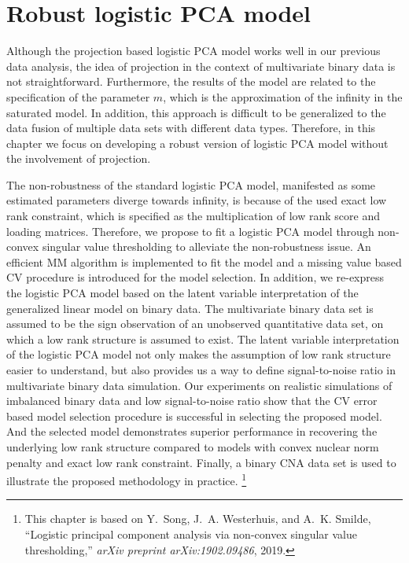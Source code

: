 \chapter{Robust logistic PCA model} \label{chapter:3}
Although the projection based logistic PCA model works well in our previous data analysis, the idea of projection in the context of multivariate binary data is not straightforward. Furthermore, the results of the model are related to the specification of the parameter $m$, which is the approximation of the infinity in the saturated model. In addition, this approach is difficult to be generalized to the data fusion of multiple data sets with different data types. Therefore, in this chapter we focus on developing a robust version of logistic PCA model without the involvement of projection.

The non-robustness of the standard logistic PCA model, manifested as some estimated parameters diverge towards infinity, is because of the used exact low rank constraint, which is specified as the multiplication of low rank score and loading matrices. Therefore, we propose to fit a logistic PCA model through non-convex singular value thresholding to alleviate the non-robustness issue. An efficient MM algorithm is implemented to fit the model and a missing value based CV procedure is introduced for the model selection. In addition, we re-express the logistic PCA model based on the latent variable interpretation of the generalized linear model on binary data. The multivariate binary data set is assumed to be the sign observation of an unobserved quantitative data set, on which a low rank structure is assumed to exist. The latent variable interpretation of the logistic PCA model not only makes the assumption of low rank structure easier to understand, but also provides us a way to define signal-to-noise ratio in multivariate binary data simulation. Our experiments on realistic simulations of imbalanced binary data and low signal-to-noise ratio show that the CV error based model selection procedure is successful in selecting the proposed model. And the selected model demonstrates superior performance in recovering the underlying low rank structure compared to models with convex nuclear norm penalty and exact low rank constraint. Finally, a binary CNA data set is used to illustrate the proposed methodology in practice.
\footnote{This chapter is based on Y.~Song, J.~A. Westerhuis, and A.~K. Smilde, ``Logistic principal component analysis via non-convex singular value thresholding,'' {\em arXiv preprint
  arXiv:1902.09486}, 2019.}

